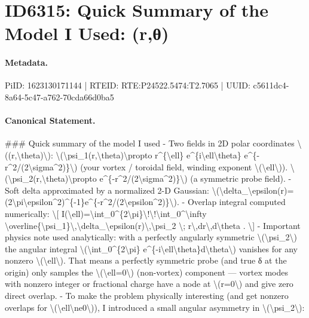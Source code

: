 \section*{ID6315: Quick Summary of the Model I Used: (r,θ)}
\paragraph{Metadata.}
PiID: 1623130171144 | RTEID: RTE:P24522.5474:T2.7065 | UUID: c5611dc4-8a64-5c47-a762-70cda66d0ba5

\paragraph{Canonical Statement.}
\#\#\# Quick summary of the model I used - Two fields in 2D polar coordinates \textbackslash{}((r,\textbackslash{}theta)\textbackslash{}): \textbackslash{}(\textbackslash{}psi\_1(r,\textbackslash{}theta)\textbackslash{}propto r\textasciicircum{}\{\textbackslash{}ell\} e\textasciicircum{}\{i\textbackslash{}ell\textbackslash{}theta\} e\textasciicircum{}\{-r\textasciicircum{}2/(2\textbackslash{}sigma\textasciicircum{}2)\}\textbackslash{}) (your vortex / toroidal field, winding exponent \textbackslash{}(\textbackslash{}ell\textbackslash{})). \textbackslash{}(\textbackslash{}psi\_2(r,\textbackslash{}theta)\textbackslash{}propto e\textasciicircum{}\{-r\textasciicircum{}2/(2\textbackslash{}sigma\textasciicircum{}2)\}\textbackslash{}) (a symmetric probe field). - Soft delta approximated by a normalized 2-D Gaussian: \textbackslash{}(\textbackslash{}delta\_\textbackslash{}epsilon(r)=(2\textbackslash{}pi\textbackslash{}epsilon\textasciicircum{}2)\textasciicircum{}\{-1\}e\textasciicircum{}\{-r\textasciicircum{}2/(2\textbackslash{}epsilon\textasciicircum{}2)\}\textbackslash{}). - Overlap integral computed numerically: \textbackslash{}[ I(\textbackslash{}ell)=\textbackslash{}int\_0\textasciicircum{}\{2\textbackslash{}pi\}\textbackslash{}!\textbackslash{}!\textbackslash{}int\_0\textasciicircum{}\textbackslash{}infty \textbackslash{}overline\{\textbackslash{}psi\_1\}\textbackslash{},\textbackslash{}delta\_\textbackslash{}epsilon(r)\textbackslash{},\textbackslash{}psi\_2 \textbackslash{}; r\textbackslash{},dr\textbackslash{},d\textbackslash{}theta . \textbackslash{}] - Important physics note used analytically: with a perfectly angularly symmetric \textbackslash{}(\textbackslash{}psi\_2\textbackslash{}) the angular integral \textbackslash{}(\textbackslash{}int\_0\textasciicircum{}\{2\textbackslash{}pi\} e\textasciicircum{}\{-i\textbackslash{}ell\textbackslash{}theta\}d\textbackslash{}theta\textbackslash{}) vanishes for any nonzero \textbackslash{}(\textbackslash{}ell\textbackslash{}). That means a perfectly symmetric probe (and true δ at the origin) only samples the \textbackslash{}(\textbackslash{}ell=0\textbackslash{}) (non-vortex) component — vortex modes with nonzero integer or fractional charge have a node at \textbackslash{}(r=0\textbackslash{}) and give zero direct overlap. - To make the problem physically interesting (and get nonzero overlaps for \textbackslash{}(\textbackslash{}ell\textbackslash{}ne0\textbackslash{})), I introduced a small angular asymmetry in \textbackslash{}(\textbackslash{}psi\_2\textbackslash{}): 